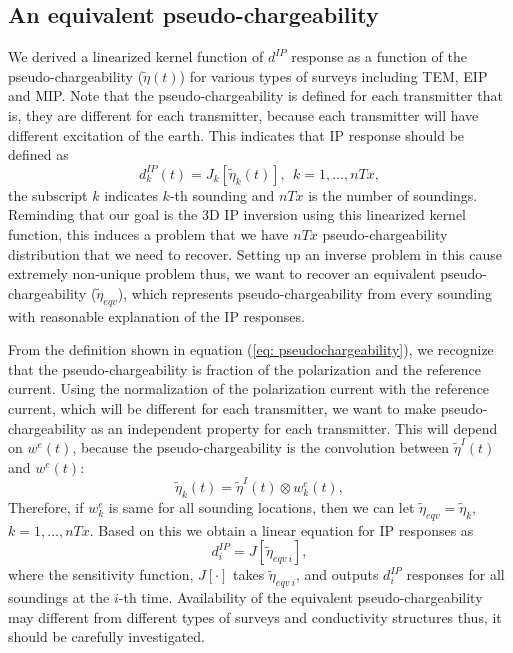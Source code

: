 \documentclass[a4paper, 11pt]{article}
\newcommand{\peta}{\tilde{\eta}}
\newcommand{\dip}{d^{IP}}
\begin{document}
\subsection{An equivalent pseudo-chargeability}
We derived a linearized kernel function of $\dip$ response as a function of the pseudo-chargeability ($\peta(t)$) for various types of surveys including TEM, EIP and MIP. Note that the pseudo-chargeability is defined for each transmitter that is, they are different for each transmitter, because each transmitter will have different excitation of the earth. This indicates that IP response should be defined as 
\begin{equation}
  \dip_k(t) = J_k[\peta_k (t)], \ \ k=1, \ldots, nTx,
\end{equation}
the subscript $k$ indicates $k$-th sounding and $nTx$ is the number of soundings. Reminding that our goal is the 3D IP inversion using this linearized kernel function, this induces a problem that we have $nTx$ pseudo-chargeability distribution that we need to recover. Setting up an inverse problem in this cause extremely non-unique problem thus, we want to recover an equivalent pseudo-chargeability ($\peta_{eqv}$), which represents pseudo-chargeability from every sounding with reasonable explanation of the IP responses. 

From the definition shown in equation (\ref{eq: pseudochargeability}), we recognize that the pseudo-chargeability is fraction of the polarization and the reference current. Using the normalization of the polarization current with the reference current, which will be different for each transmitter, we want to make pseudo-chargeability as an independent property for each transmitter. This will depend on $w^e(t)$, because the pseudo-chargeability is the convolution between $\peta^{I}(t)$ and $w^e(t)$:
\begin{equation}
  \peta_k(t) = \peta^{I}(t) \otimes w^e_k(t),
  \label{eq: pseudochargeability_petaI}
\end{equation}
Therefore, if $w^e_k$ is same for all sounding locations, then we can let $\peta_{eqv} = \peta_k$, $k=1, \ldots, nTx$. Based on this we obtain a linear equation for IP responses as
\begin{equation}
  \dip_i =J[\peta_{eqv \ i}],
  \label{eq: pseudochargeability_equivalent}
\end{equation}
where the sensitivity function, $J[\cdot]$ takes $\peta_{eqv \ i}$, and outputs $\dip_i$ responses for all soundings at the $i$-th time. Availability of the equivalent pseudo-chargeability may different from different types of surveys and conductivity structures thus, it should be carefully investigated. 
\end{document}
